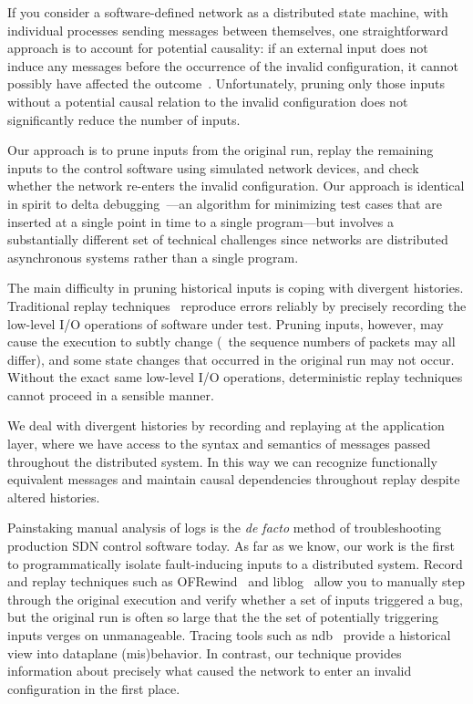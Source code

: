 If you consider a software-defined network as a distributed state machine,
with individual processes sending messages between themselves, one straightforward approach is
to account for potential causality: if an external input does not induce any messages before
the occurrence of the invalid configuration, it
cannot possibly have affected the outcome~\cite{Lamport:1978:TCO:359545.359563}.
Unfortunately, pruning only those inputs without a potential causal relation to
the invalid configuration does not
significantly reduce the number of inputs.

Our approach is to prune inputs from the original run, replay the remaining
inputs to the control software using simulated network devices, and
check whether the network re-enters the invalid configuration.
Our approach is identical in spirit to delta
debugging~\cite{Zeller:1999:YMP:318773.318946}---an algorithm for
minimizing test cases that are inserted at a single
point in time to a single program---but
involves a substantially different set of technical challenges since networks are
distributed asynchronous systems rather than a single program.

The main difficulty in pruning historical inputs is
coping with divergent histories. Traditional replay
techniques~\cite{Dunlap:2002:REI:844128.844148,Geels:2006:RDD:1267359.1267386}
reproduce errors reliably by precisely recording the low-level I/O operations of
software under test. Pruning inputs, however, may cause the execution to
subtly change (\eg~the sequence numbers of packets may all differ), and some
state changes that occurred in the original
run may not occur. Without the exact same low-level I/O operations,
deterministic replay techniques cannot proceed in a sensible manner.

We deal with divergent histories by recording and replaying at the application layer,
where we have access to the syntax and semantics of messages passed
throughout the distributed system. In this way we can recognize functionally
equivalent messages and maintain causal dependencies throughout replay despite
altered histories.

Painstaking manual analysis of logs is the
{\em de facto} method of troubleshooting production SDN control software
today. As far as we know, our work
is the first to programmatically isolate fault-inducing inputs to a distributed
system. Record and replay techniques such as
OFRewind~\cite{ofrewind} and liblog~\cite{Geels:2006:RDD:1267359.1267386}
allow you to manually step through the original execution and verify whether a
set of inputs triggered a bug,
but the original run is often so large that the
the set of potentially triggering inputs verges on unmanageable.
Tracing tools such as ndb~\cite{handigol2012debugger} provide
a historical view into dataplane (mis)behavior. In contrast, our technique provides
information about precisely what caused the network to
enter an invalid configuration in the first place.

